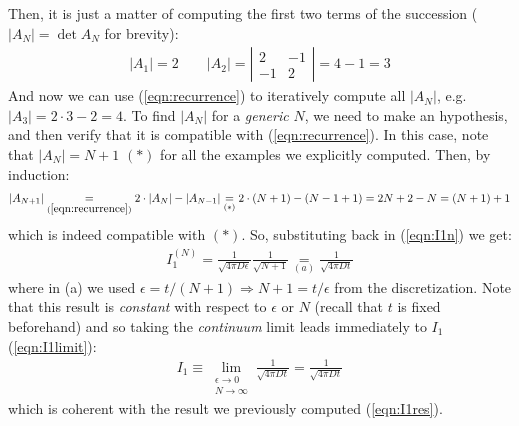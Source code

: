 \documentclass[../template.tex]{subfiles}
\begin{document}
Then, it is just a matter of computing the first two terms of the succession ($|A_N| = \operatorname{det}A_N$ for brevity):
\begin{align*}
    |A_1| = 2 \qquad |A_2| = \left|\begin{array}{cc}
    2 & -1 \\ 
    -1 & 2
    \end{array}\right| = 4-1=3
\end{align*}
And now we can use (\ref{eqn:recurrence}) to iteratively compute all $|A_N|$, e.g. $|A_3| = 2 \cdot 3 - 2 = 4$. To find $|A_N|$ for a \textit{generic} $N$, we need to make an hypothesis, and then verify that it is compatible with (\ref{eqn:recurrence}). In this case, note that $|A_N| = N+1$ $(*)$ for all the examples we explicitly computed. Then, by induction:
\begin{align*}
    |A_{N+1}| \underset{(\ref{eqn:recurrence})}{=} 2 \cdot |A_N| - |A_{N-1}| \underset{(*)}{=} 2\cdot (N+1) - (N-1+1) = 2 N + 2 -N = (N+1) +1   
\end{align*}    
which is indeed compatible with $(*)$. So, substituting back in (\ref{eqn:I1n}) we get:
\begin{align*}
    I_1^{(N)} = \frac{1}{\sqrt{4 \pi D \epsilon}} \frac{1}{\sqrt{N+1}} \underset{(a)}{=}  \frac{1}{\sqrt{4 \pi D t}} 
\end{align*}
where in (a) we used $\epsilon = t/(N+1) \Rightarrow N+1 = t/\epsilon $ from the discretization. Note that this result is \textit{constant} with respect to $\epsilon$ or $N$ (recall that $t$ is fixed beforehand) and so taking the \textit{continuum} limit leads immediately to $I_1$ (\ref{eqn:I1limit}):
\begin{align*}
    I_1 \equiv \lim_{\substack{\epsilon \to 0\\ N \to \infty}} \frac{1}{\sqrt{4 \pi D t}} = \frac{1}{\sqrt{4 \pi D t}}  
\end{align*}     
which is coherent with the result we previously computed (\ref{eqn:I1res}).
\end{document}
